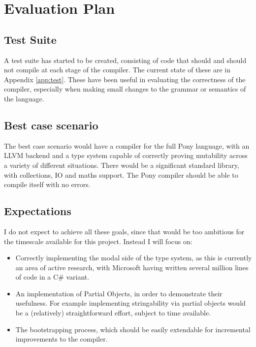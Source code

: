 \documentclass[11pt,a4paper]{report}
\begin{document}
\newpage
\chapter{Evaluation Plan}
\label{chapter:evaluation}

\section{Test Suite}

A test suite has started to be created, consisting of code that should and should not compile at each stage of the compiler.
The current state of these are in Appendix \ref{app:test}.
These have been useful in evaluating the correctness of the compiler, especially when making small changes to the grammar or semantics of the language.

\section{Best case scenario}

The best case scenario would have a compiler for the full Pony language, with an LLVM backend and a type system capable of correctly proving mutability across a variety of different situations.
There would be a significant standard library, with collections, IO and maths support.
The Pony compiler should be able to compile itself with no errors.

\section{Expectations}

I do not expect to achieve all these goals, since that would be too ambitious for the timescale available for this project.
Instead I will focus on:
\begin{itemize}
\item Correctly implementing the modal side of the type system, as	this is currently an area of active research, with Microsoft having written several million lines of code in a C\# variant\cite{microsoft2012}.
\item An implementation of Partial Objects, in order to demonstrate their usefulness.
	For example implementing stringability via partial objects would be a (relatively) straightforward effort, subject to time available.
\item The bootstrapping process, which should be easily extendable for incremental improvements to the compiler.
\end{itemize}
\end{document}
